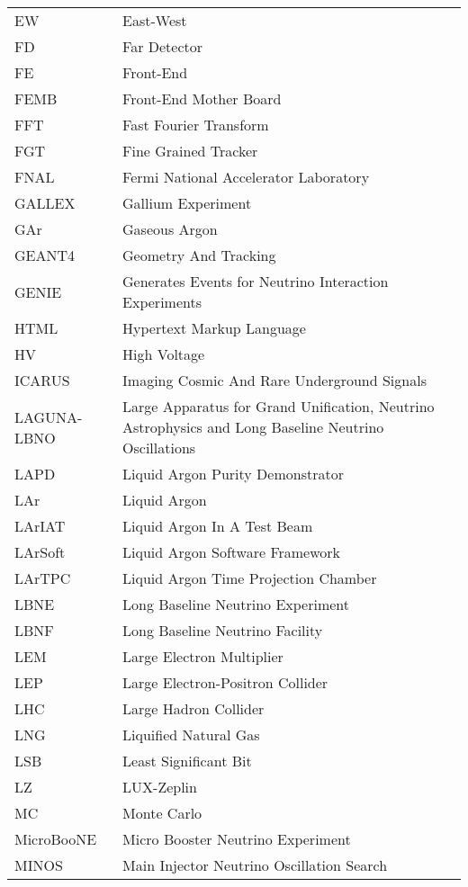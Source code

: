 \begin{longtable}{l p{11cm}}
EW          & East-West \\
FD          & Far Detector \\
FE          & Front-End \\
FEMB        & Front-End Mother Board \\
FFT         & Fast Fourier Transform \\
FGT         & Fine Grained Tracker \\
FNAL        & Fermi National Accelerator Laboratory \\
GALLEX      & Gallium Experiment \\
GAr         & Gaseous Argon \\
GEANT4      & Geometry And Tracking \\
GENIE       & Generates Events for Neutrino Interaction Experiments \\
HTML        & Hypertext Markup Language \\
HV          & High Voltage \\
ICARUS      & Imaging Cosmic And Rare Underground Signals \\
LAGUNA-LBNO & Large Apparatus for Grand Unification, Neutrino Astrophysics and Long Baseline Neutrino Oscillations \\
LAPD        & Liquid Argon Purity Demonstrator \\
LAr         & Liquid Argon \\
LArIAT      & Liquid Argon In A Test Beam \\
LArSoft     & Liquid Argon Software Framework \\
LArTPC      & Liquid Argon Time Projection Chamber \\
LBNE        & Long Baseline Neutrino Experiment \\
LBNF        & Long Baseline Neutrino Facility \\
LEM         & Large Electron Multiplier\\
LEP         & Large Electron-Positron Collider\\
LHC         & Large Hadron Collider \\
LNG         & Liquified Natural Gas \\
LSB         & Least Significant Bit \\
LZ          & LUX-Zeplin \\
MC          & Monte Carlo \\
MicroBooNE  & Micro Booster Neutrino Experiment \\
MINOS       & Main Injector Neutrino Oscillation Search \\

\end{longtable}
